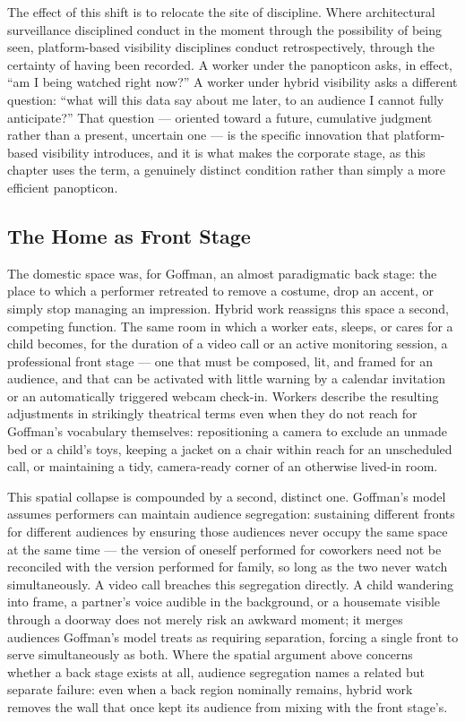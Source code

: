 \documentclass[12pt, a4paper]{article}
\begin{document}
The effect of this shift is to relocate the site of discipline. Where architectural surveillance disciplined conduct in the moment through the possibility of being seen, platform-based visibility disciplines conduct retrospectively, through the certainty of having been recorded. A worker under the panopticon asks, in effect, ``am I being watched right now?'' A worker under hybrid visibility asks a different question: ``what will this data say about me later, to an audience I cannot fully anticipate?'' That question --- oriented toward a future, cumulative judgment rather than a present, uncertain one --- is the specific innovation that platform-based visibility introduces, and it is what makes the corporate stage, as this chapter uses the term, a genuinely distinct condition rather than simply a more efficient panopticon.

\subsection{The Home as Front Stage}

The domestic space was, for Goffman, an almost paradigmatic back stage: the place to which a performer retreated to remove a costume, drop an accent, or simply stop managing an impression. Hybrid work reassigns this space a second, competing function. The same room in which a worker eats, sleeps, or cares for a child becomes, for the duration of a video call or an active monitoring session, a professional front stage --- one that must be composed, lit, and framed for an audience, and that can be activated with little warning by a calendar invitation or an automatically triggered webcam check-in. Workers describe the resulting adjustments in strikingly theatrical terms even when they do not reach for Goffman's vocabulary themselves: repositioning a camera to exclude an unmade bed or a child's toys, keeping a jacket on a chair within reach for an unscheduled call, or maintaining a tidy, camera-ready corner of an otherwise lived-in room.

This spatial collapse is compounded by a second, distinct one. Goffman's model assumes performers can maintain audience segregation: sustaining different fronts for different audiences by ensuring those audiences never occupy the same space at the same time --- the version of oneself performed for coworkers need not be reconciled with the version performed for family, so long as the two never watch simultaneously. A video call breaches this segregation directly. A child wandering into frame, a partner's voice audible in the background, or a housemate visible through a doorway does not merely risk an awkward moment; it merges audiences Goffman's model treats as requiring separation, forcing a single front to serve simultaneously as both. Where the spatial argument above concerns whether a back stage exists at all, audience segregation names a related but separate failure: even when a back region nominally remains, hybrid work removes the wall that once kept its audience from mixing with the front stage's.
\end{document}

